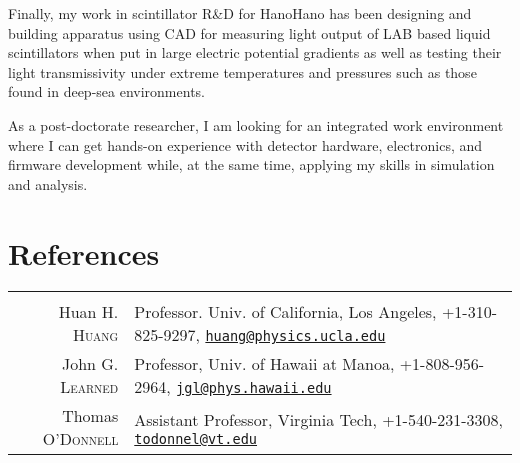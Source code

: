 \documentclass[a4paper,10pt]{article} %
\begin{document}
Finally, my work in scintillator R\&D for HanoHano has been designing and
building apparatus using CAD for measuring light output of LAB based liquid
scintillators when put in large electric potential gradients as well as testing
their light transmissivity under extreme temperatures and pressures such as
those found in deep-sea environments.

As a post-doctorate researcher, I am looking for an integrated work environment
where I can get hands-on experience with detector hardware, electronics, and
firmware development while, at the same time, applying my skills in simulation
and analysis.


\section{References}

\begin{tabular}{rp{12cm}}
\multicolumn{2}{c}{}\\
Huan H. \textsc{Huang} & Professor. Univ. of California, Los Angeles, +1-310-825-9297,
\href{mailto:huang@physics.ucla.edu}{\nolinkurl{huang@physics.ucla.edu}}\\
John G. \textsc{Learned} & Professor, Univ. of Hawaii at Manoa, +1-808-956-2964,
\href{mailto:jgl@phys.hawaii.edu}{\nolinkurl{jgl@phys.hawaii.edu}}\\
Thomas \textsc{O'Donnell} & Assistant Professor, Virginia Tech, +1-540-231-3308,
\href{mailto:tdonnell@vt.edu}{\nolinkurl{todonnel@vt.edu}}\\

%
%

\end{tabular}

\end{document}
